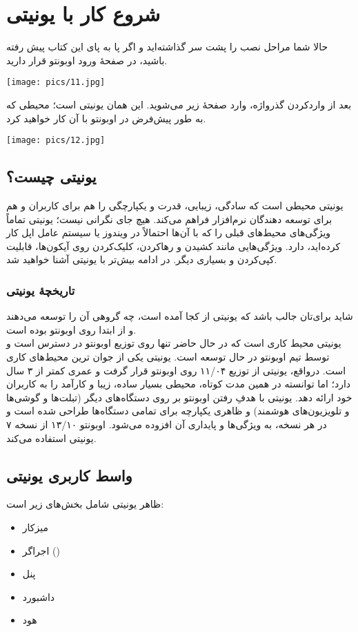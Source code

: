 \chapter{شروع کار با یونیتی}
حالا شما مراحل نصب را پشت سر گذاشته‌اید و اگر پا به پای این کتاب پیش رفته باشید، در صفحهٔ ورود اوبونتو قرار دارید.
\begin{center}
\texttt{[image: pics/11.jpg]}
\end{center}

بعد از واردکردن گذرواژه، وارد صفحهٔ زیر می‌شوید. این همان یونیتی است؛ محیطی که به طور پیش‌فرض در اوبونتو با آن کار خواهید کرد.
\begin{center}
\texttt{[image: pics/12.jpg]}
\end{center}

\section{یونیتی چیست؟}
یونیتی محیطی است که سادگی، زیبایی، قدرت و یکپارچگی را هم برای کاربران و هم برای توسعه دهندگان نرم‌افزار فراهم می‌کند.
هیچ جای نگرانی نیست؛ یونیتی تماماً ویژگی‌های محیط‌های قبلی را که با آن‌ها احتمالاً در ویندوز یا سیستم عامل اپل کار کرده‌اید، دارد. ویژگی‌هایی مانند کشیدن و رهاکردن، کلیک‌کردن روی آیکون‌ها، قابلیت کپی‌کردن و بسیاری دیگر.
در ادامه بیش‌تر با یونیتی آشنا خواهید شد.
\subsection{تاریخچهٔ یونیتی}
شاید برای‌تان جالب باشد که یونیتی از کجا آمده است، چه گروهی آن را توسعه می‌دهند و از ابتدا روی اوبونتو بوده است.\\
یونیتی محیط کاری است که در حال حاضر تنها روی توزیع اوبونتو در دسترس است و توسط تیم اوبونتو در حال توسعه است. یونیتی یکی از جوان ترین محیط‌های کاری است. در‌واقع، یونیتی از توزیع ۱۱/۰۴ روی اوبونتو قرار گرفت و عمری کمتر از ۳ سال دارد؛ اما توانسته در همین مدت کوتاه، محیطی بسیار ساده، زیبا و کارآمد را به کاربران خود ارائه دهد. یونیتی با هدفِ رفتن اوبونتو بر روی دستگاه‌های دیگر (تبلت‌ها و گوشی‌ها و تلویزیون‌های هوشمند) و ظاهری یکپارچه برای تمامی دستگاه‌ها طراحی شده است و در هر نسخه، به ویژگی‌ها و پایداری آن افزوده می‌شود. اوبونتو ۱۳/۱۰ از نسخه ۷ یونیتی استفاده می‌کند.
\section{واسط کاربری یونیتی}
ظاهر یونیتی شامل بخش‌های زیر است:
\begin{itemize}
\item میزکار
\item اجراگر ()
\item پنل
\item داشبورد
\item هود
\end{itemize}

